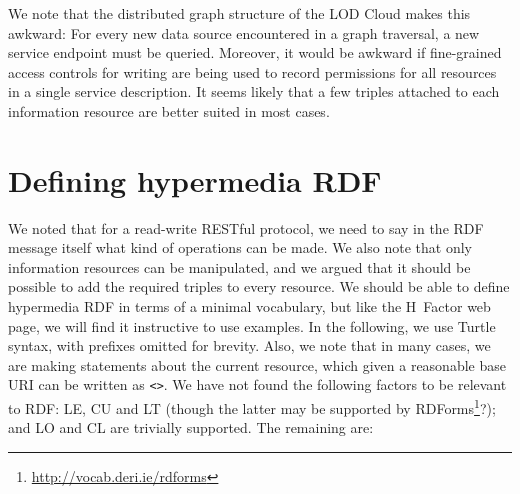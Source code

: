 \documentclass{llncs}
\begin{document}
We note that the distributed graph structure of the LOD Cloud makes
this awkward: For every new data source encountered in a graph
traversal, a new service endpoint must be queried. Moreover, it would
be awkward if fine-grained access controls for writing are being used
to record permissions for all resources in a single service
description. It seems likely that a few triples attached to each
information resource are better suited in most cases.

\section{Defining hypermedia RDF}

We noted that for a read-write RESTful protocol, we need to say in the
RDF message itself what kind of operations can be made. We also note
that only information resources can be manipulated, and we argued that
it should be possible to add the required triples to every
resource. We should be able to define hypermedia RDF in terms of a
minimal vocabulary, but like the H~Factor web page, we will find it
instructive to use examples. In the following, we use Turtle syntax,
with prefixes omitted for brevity. Also, we note that in many cases,
we are making statements about the current resource, which given a
reasonable base URI can be written as \texttt{<>}. We have not found
the following factors to be relevant to RDF: \textsf{LE}, \textsf{CU}
and \textsf{LT} (though the latter may be supported by
RDForms\footnote{\url{http://vocab.deri.ie/rdforms}}?); and
\textsf{LO} and \textsf{CL} are trivially supported. The remaining are:
\end{document}
